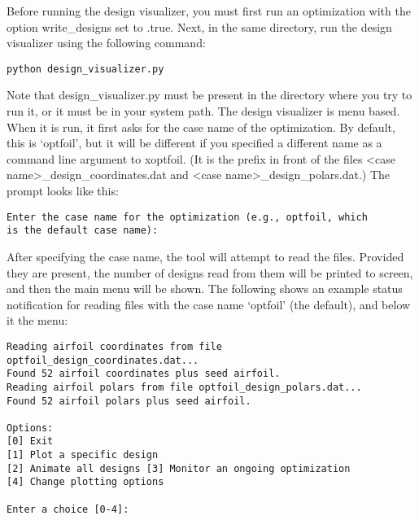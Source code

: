 \documentclass[11pt]{article}
\begin{document}
Before running the design visualizer, you must first run an optimization with the option
write\_designs set to .true. Next, in the same directory, run the design visualizer using
the following command:

\begin{verbatim}
python design_visualizer.py
\end{verbatim}

Note that design\_visualizer.py must be present in the directory where you try to run it,
or it must be in your system path.  The design visualizer is menu based.  When it is run, 
it first asks for the case name of the optimization.  By default, this is `optfoil', but
it will be different if you specified a different name as a command line argument to
xoptfoil. (It is the prefix in front of the files 
\textless case name\textgreater\_design\_coordinates.dat and
\textless case name\textgreater\_design\_polars.dat.)  The prompt looks like this:

\begin{verbatim}
Enter the case name for the optimization (e.g., optfoil, which 
is the default case name): 
\end{verbatim}

After specifying the case name, the tool will attempt to read the files.  Provided they
are present, the number of designs read from them will be printed to screen, and then the
main menu will be shown.  The following shows an example status notification for reading
files with the case name `optfoil' (the default), and below it the menu:

\begin{verbatim}
Reading airfoil coordinates from file optfoil_design_coordinates.dat...
Found 52 airfoil coordinates plus seed airfoil.
Reading airfoil polars from file optfoil_design_polars.dat...
Found 52 airfoil polars plus seed airfoil.

Options:
[0] Exit
[1] Plot a specific design
[2] Animate all designs [3] Monitor an ongoing optimization
[4] Change plotting options

Enter a choice [0-4]: 
\end{verbatim}
\end{document}
